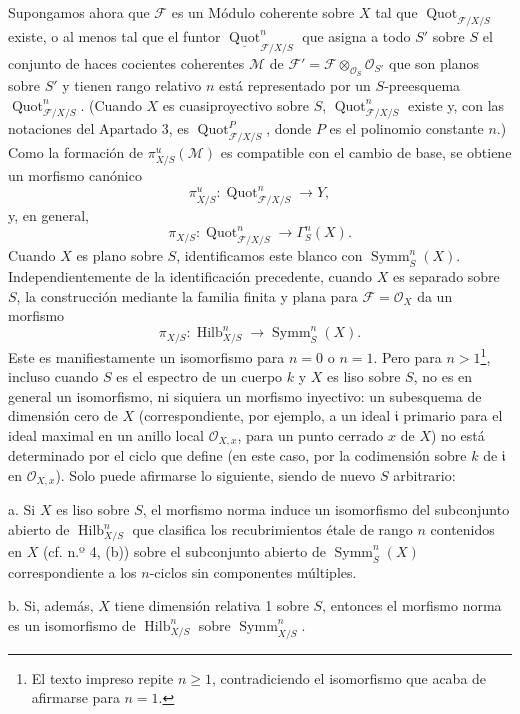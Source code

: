 Supongamos ahora que $\mathcal F$ es un Módulo coherente sobre $X$ tal que
$\operatorname{Quot}_{\mathcal F/X/S}$ existe, o al menos tal que el funtor
$\underline{\operatorname{Quot}}^n_{\mathcal F/X/S}$ que asigna a todo $S'$
sobre $S$ el conjunto de haces cocientes coherentes $\mathcal M$ de
$\mathcal F'=\mathcal F\otimes_{\mathcal O_S}\mathcal O_{S'}$ que son planos
sobre $S'$ y tienen rango relativo $n$ está representado por un $S$-preesquema
$\operatorname{Quot}^n_{\mathcal F/X/S}$. (Cuando $X$ es cuasiproyectivo
sobre $S$, $\operatorname{Quot}^n_{\mathcal F/X/S}$ existe y, con las
notaciones del Apartado 3, es $\operatorname{Quot}^P_{\mathcal F/X/S}$, donde
$P$ es el polinomio constante $n$.) Como la formación de
$\pi^u_{X/S}(\mathcal M)$ es compatible con el cambio de base, se obtiene un
morfismo canónico
\[
\pi^u_{X/S}:\operatorname{Quot}^n_{\mathcal F/X/S}\longrightarrow Y,
\]
y, en general,
\[
\pi_{X/S}:\operatorname{Quot}^n_{\mathcal F/X/S}
\longrightarrow\Gamma^n_S(X).
\]
Cuando $X$ es plano sobre $S$, identificamos este blanco con $\operatorname{Symm}^n_S(X)$.
Independientemente de la identificación precedente, cuando $X$ es separado sobre $S$, la construcción mediante la familia finita y plana para $\mathcal F=\mathcal O_X$ da un morfismo
\[
\pi_{X/S}:\operatorname{Hilb}^n_{X/S}
\longrightarrow\operatorname{Symm}^n_S(X).
\]
Este es manifiestamente un isomorfismo para $n=0$ o $n=1$. Pero para
$n>1$\footnote{El texto impreso repite $n\geq1$, contradiciendo el
isomorfismo que acaba de afirmarse para $n=1$.}, incluso cuando $S$ es el
espectro de un cuerpo $k$ y $X$ es liso sobre $S$, no es en general un
isomorfismo, ni siquiera un morfismo inyectivo: un subesquema de dimensión cero
de $X$ (correspondiente, por ejemplo, a un ideal $\mathfrak i$ primario para el
ideal maximal en un anillo local $\mathcal O_{X,x}$, para un punto cerrado $x$
de $X$) no está determinado por el ciclo que define (en este caso, por la
codimensión sobre $k$ de $\mathfrak i$ en $\mathcal O_{X,x}$). Solo puede
afirmarse lo siguiente, siendo de nuevo $S$ arbitrario:

\medskip
\noindent a. Si $X$ es liso sobre $S$, el morfismo norma induce un isomorfismo
del subconjunto abierto de $\operatorname{Hilb}^n_{X/S}$ que clasifica los
recubrimientos étale de rango $n$ contenidos en $X$ (cf. n.º 4, (b)) sobre el
subconjunto abierto de $\operatorname{Symm}^n_S(X)$ correspondiente a los
$n$-ciclos sin componentes múltiples.

\medskip
\noindent b. Si, además, $X$ tiene dimensión relativa 1 sobre $S$, entonces el
morfismo norma es un isomorfismo de $\operatorname{Hilb}^n_{X/S}$ sobre
$\operatorname{Symm}^n_{X/S}$.

